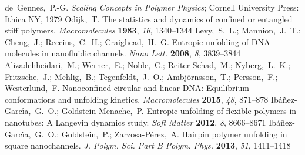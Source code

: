 \documentclass[journal=mamobx,manuscript=article,layout=twocolumn]{achemso}
\begin{document}
\begin{mcitethebibliography}{52}
de~Gennes,~P.-G. \emph{Scaling Concepts in Polymer Physics}; Cornell University
  Press: Ithica NY, 1979\relax
\mciteBstWouldAddEndPuncttrue
\mciteSetBstMidEndSepPunct{\mcitedefaultmidpunct}
{\mcitedefaultendpunct}{\mcitedefaultseppunct}\relax
\EndOfBibitem
{}
Odijk,~T. The statistics and dynamics of confined or entangled stiff polymers.
  \emph{Macromolecules} \textbf{1983}, \emph{16}, 1340--1344\relax
\mciteBstWouldAddEndPuncttrue
\mciteSetBstMidEndSepPunct{\mcitedefaultmidpunct}
{\mcitedefaultendpunct}{\mcitedefaultseppunct}\relax
\EndOfBibitem
{}
Levy,~S.~L.; Mannion,~J.~T.; Cheng,~J.; Reccius,~C.~H.; Craighead,~H.~G.
  Entropic unfolding of DNA molecules in nanofluidic channels. \emph{Nano
  Lett.} \textbf{2008}, \emph{8}, 3839--3844\relax
\mciteBstWouldAddEndPuncttrue
\mciteSetBstMidEndSepPunct{\mcitedefaultmidpunct}
{\mcitedefaultendpunct}{\mcitedefaultseppunct}\relax
\EndOfBibitem
{}
Alizadehheidari,~M.; Werner,~E.; Noble,~C.; Reiter-Schad,~M.; Nyberg,~L.~K.;
  Fritzsche,~J.; Mehlig,~B.; Tegenfeldt,~J.~O.; Ambj\"ornsson,~T.; Persson,~F.;
  Westerlund,~F. Nanoconfined circular and linear DNA: Equilibrium
  conformations and unfolding kinetics. \emph{Macromolecules} \textbf{2015},
  \emph{48}, 871--878\relax
\mciteBstWouldAddEndPuncttrue
\mciteSetBstMidEndSepPunct{\mcitedefaultmidpunct}
{\mcitedefaultendpunct}{\mcitedefaultseppunct}\relax
\EndOfBibitem
{}
Ib{\'a}{\~n}ez-Garc{\'\i}a,~G.~O.; Goldstein-Menache,~P. Entropic unfolding of
  flexible polymers in nanotubes: A Langevin dynamics study. \emph{Soft Matter}
  \textbf{2012}, \emph{8}, 8666--8671\relax
\mciteBstWouldAddEndPuncttrue
\mciteSetBstMidEndSepPunct{\mcitedefaultmidpunct}
{\mcitedefaultendpunct}{\mcitedefaultseppunct}\relax
\EndOfBibitem
{}
Ib{\'a}{\~n}ez-Garc{\'\i}a,~G.~O.; Goldstein,~P.; Zarzosa-P{\'e}rez,~A. Hairpin
  polymer unfolding in square nanochannels. \emph{J. Polym. Sci. Part B Polym.
  Phys.} \textbf{2013}, \emph{51}, 1411--1418\relax
\mciteBstWouldAddEndPuncttrue
\mciteSetBstMidEndSepPunct{\mcitedefaultmidpunct}

\end{mcitethebibliography}
\end{document}
